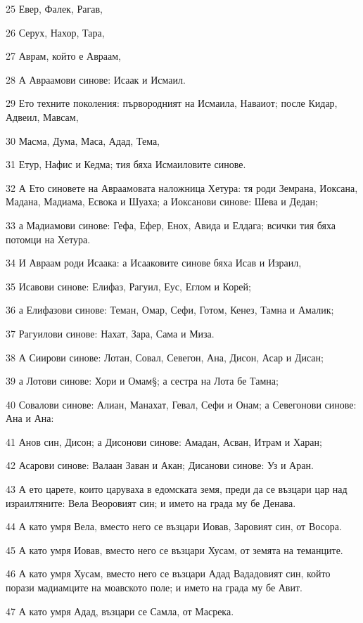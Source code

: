 \par 25 Евер, Фалек, Рагав,
\par 26 Серух, Нахор, Тара,
\par 27 Аврам, който е Авраам,
\par 28 А Авраамови синове: Исаак и Исмаил.
\par 29 Ето техните поколения: първородният на Исмаила, Наваиот; после Кидар, Адвеил, Мавсам,
\par 30 Масма, Дума, Маса, Адад, Тема,
\par 31 Етур, Нафис и Кедма; тия бяха Исмаиловите синове.
\par 32 А Ето синовете на Авраамовата наложница Хетура: тя роди Земрана, Иоксана, Мадана, Мадиама, Есвока и Шуаха; а Иоксанови синове: Шева и Дедан;
\par 33 а Мадиамови синове: Гефа, Ефер, Енох, Авида и Елдага; всички тия бяха потомци на Хетура.
\par 34 И Авраам роди Исаака: а Исааковите синове бяха Исав и Израил,
\par 35 Исавови синове: Елифаз, Рагуил, Еус, Еглом и Корей;
\par 36 а Елифазови синове: Теман, Омар, Сефи, Готом, Кенез, Тамна и Амалик;
\par 37 Рагуилови синове: Нахат, Зара, Сама и Миза.
\par 38 А Сиирови синове: Лотан, Совал, Севегон, Ана, Дисон, Асар и Дисан;
\par 39 а Лотови синове: Хори и Омам§; а сестра на Лота бе Тамна;
\par 40 Совалови синове: Алиан, Манахат, Гевал, Сефи и Онам; а Севегонови синове: Ана и Ана:
\par 41 Анов син, Дисон; а Дисонови синове: Амадан, Асван, Итрам и Харан;
\par 42 Асарови синове: Валаан Заван и Акан; Дисанови синове: Уз и Аран.
\par 43 А ето царете, които царуваха в едомската земя, преди да се възцари цар над израилтяните: Вела Веоровият син; и името на града му бе Денава.
\par 44 А като умря Вела, вместо него се възцари Иовав, Заровият син, от Восора.
\par 45 А като умря Иовав, вместо него се възцари Хусам, от земята на теманците.
\par 46 А като умря Хусам, вместо него се възцари Адад Вададовият син, който порази мадиамците на моавското поле; и името на града му бе Авит.
\par 47 А като умря Адад, възцари се Самла, от Масрека.
